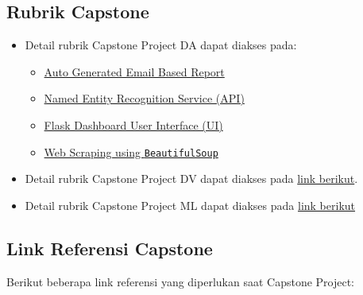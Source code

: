\documentclass[
]{book}
\providecommand{\tightlist}{%
  \setlength{\itemsep}{0pt}\setlength{\parskip}{0pt}}
\begin{document}
\hypertarget{rubrik-capstone}{%
\subsection{Rubrik Capstone}\label{rubrik-capstone}}

\begin{itemize}
\tightlist
\item
  Detail rubrik Capstone Project DA dapat diakses pada:

  \begin{itemize}
  \tightlist
  \item
    \href{https://github.com/ttnsy/fire-capstone}{Auto Generated Email Based Report}
  \item
    \href{https://github.com/iqbalbasyar/ner-flask}{Named Entity Recognition Service (API)}
  \item
    \href{https://github.com/fafilia/capstone-UIFlask}{Flask Dashboard User Interface (UI)}
  \item
    \href{https://github.com/t3981-h/BeautifulSoup-Capstone}{Web Scraping using \texttt{BeautifulSoup}}
  \end{itemize}
\item
  Detail rubrik Capstone Project DV dapat diakses pada \href{https://rpubs.com/AlgoritmaAcademy/dv-capstone}{link berikut}.
\item
  Detail rubrik Capstone Project ML dapat diakses pada \href{https://rpubs.com/AlgoritmaAcademy/ml-capstone}{link berikut}
\end{itemize}

\hypertarget{link-referensi-capstone}{%
\subsection{Link Referensi Capstone}\label{link-referensi-capstone}}

Berikut beberapa link referensi yang diperlukan saat Capstone Project:
\end{document}
